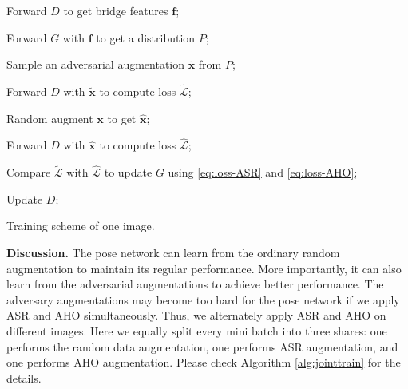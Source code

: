 \documentclass[10pt,twocolumn,letterpaper]{article}
\begin{document}
\begin{algorithm}[t!]
\SetAlgoLined
{}
Forward $D$ to get bridge features $\mathbf{f}$;

Forward $G$ with $\mathbf{f}$ to get a distribution $P$;

Sample an adversarial augmentation $\tilde{\mathbf{x}}$ from $P$;

Forward $D$ with $\tilde{\mathbf{x}}$ to compute loss $\tilde{\mathcal{L}}$;

Random augment $\mathbf{x}$ to get $\hat{\mathbf{x}}$;

Forward $D$ with $\hat{\mathbf{x}}$ to compute loss $\hat{\mathcal{L}}$;

Compare $\tilde{\mathcal{L}}$ with $\hat{\mathcal{L}}$ to update $G$ using \eqref{eq:loss-ASR} and \eqref{eq:loss-AHO};

Update $D$;
\caption{Training scheme of one image.}  \label{alg:learning}
\end{algorithm}{\bf Discussion.} The pose network can learn from the ordinary random augmentation to maintain its regular performance. More importantly, it can also learn from the adversarial augmentations to achieve better performance. The adversary augmentations may become too hard for the pose network if we apply ASR and AHO simultaneously. Thus, we alternately apply ASR and AHO on different images. Here we equally split every mini batch into three shares: one performs the random data augmentation, one performs ASR augmentation, and one performs AHO augmentation. Please check Algorithm \ref{alg:jointtrain} for the details.
\end{document}
